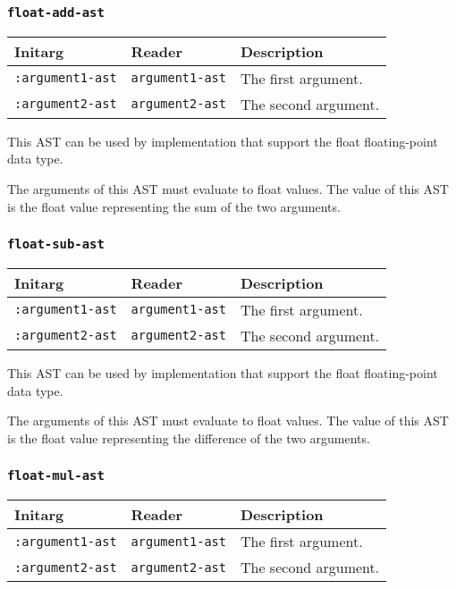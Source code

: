 \subsubsection{\texttt{float-add-ast}}
\label{sec-ast-float-add}

\begin{tabular}{|l|l|l|}
\hline
Initarg & Reader & Description\\
\hline\hline
\texttt{:argument1-ast} & \texttt{argument1-ast} & The first argument.\\
\hline
\texttt{:argument2-ast} & \texttt{argument2-ast} & The second argument.\\
\hline
\end{tabular}

This AST can be used by implementation that support the float
floating-point data type.

The arguments of this AST must evaluate to float
values.  The value of this AST is the float value
representing the sum of the two arguments.

\subsubsection{\texttt{float-sub-ast}}
\label{sec-ast-float-sub}

\begin{tabular}{|l|l|l|}
\hline
Initarg & Reader & Description\\
\hline\hline
\texttt{:argument1-ast} & \texttt{argument1-ast} & The first argument.\\
\hline
\texttt{:argument2-ast} & \texttt{argument2-ast} & The second argument.\\
\hline
\end{tabular}

This AST can be used by implementation that support the float
floating-point data type.

The arguments of this AST must evaluate to float
values.  The value of this AST is the float value
representing the difference of the two arguments.

\subsubsection{\texttt{float-mul-ast}}
\label{sec-ast-float-mul}

\begin{tabular}{|l|l|l|}
\hline
Initarg & Reader & Description\\
\hline\hline
\texttt{:argument1-ast} & \texttt{argument1-ast} & The first argument.\\
\hline
\texttt{:argument2-ast} & \texttt{argument2-ast} & The second argument.\\
\hline
\end{tabular}

